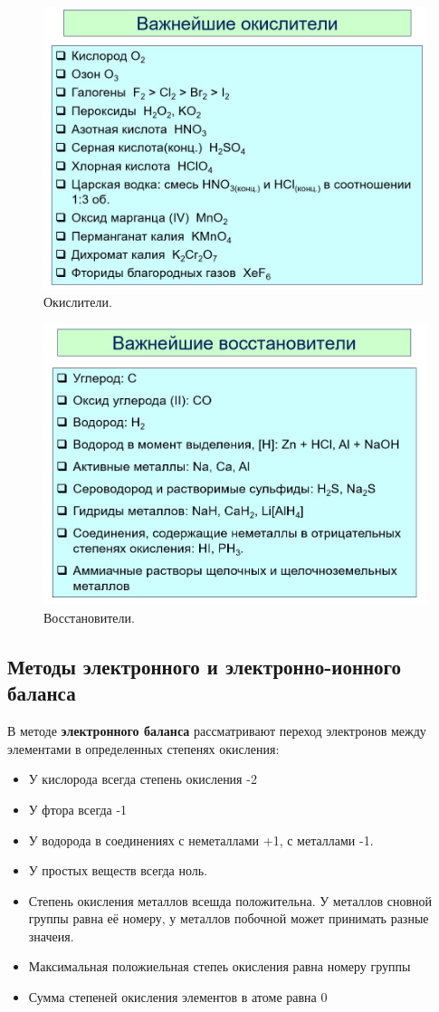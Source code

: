\begin{figure}[H]
	\centering
	\includegraphics[width=0.7\linewidth]{Pictures/Il2.jpg}
	\caption{Окислители.}
\end{figure}
\begin{figure}[H]
	\centering
	\includegraphics[width=0.7\linewidth]{Pictures/Il3.jpg}
	\caption{Восстановители.}
\end{figure}

\subsection{Методы электронного и электронно-ионного баланса}

В методе \textbf{электронного баланса} рассматривают переход электронов между элементами в определенных степенях окисления:

\begin{itemize}
	\item У кислорода всегда степень окисления -2
	\item У фтора всегда -1
	\item У водорода в соединениях с неметаллами +1, с металлами -1.
	\item У простых веществ всегда ноль.
	\item Степень окисления металлов всешда положительна. У металлов сновной группы равна её номеру, у металлов побочной может принимать разные значеия.
	\item Максимальная положиельная степеь окисления равна номеру группы
	\item Сумма степеней окисления элементов в атоме равна 0\\

\end{itemize}
	
